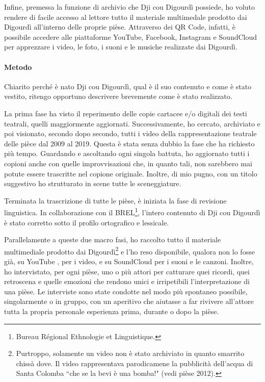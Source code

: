 Infine, premessa la funzione di archivio che Dji cou Digourdì possiede, ho voluto rendere di facile accesso al lettore tutto il materiale multimedale prodotto dai Digourdì all'interno delle proprie pièse. Attraverso dei QR Code, infatti, è possibile accedere alle piattaforme YouTube, Facebook, Instagram e SoundCloud per apprezzare i video, le foto, i suoni e le musiche realizzate dai Digourdì.


\paragraph*{Metodo} Chiarito perché è nato Dji cou Digourdì, qual è il suo contenuto e come è stato vestito, ritengo opportuno descrivere brevemente come è stato realizzato.

La prima fase ha visto il reperimento  delle copie cartacee e/o digitali dei testi teatrali, quelli maggiormente aggiornati. Successivamente, ho cercato, archiviato e poi visionato, secondo dopo secondo, tutti i video della rappresentazione teatrale delle pièce dal 2009 al 2019. Questa è stata senza dubbio la fase che ha richiesto più tempo. Guardando e ascoltando ogni singola battuta, ho aggiornato tutti i copioni anche con quelle improvvisazioni che, in quanto tali, non sarebbero mai potute essere trascritte nel copione originale. Inoltre, di mio pugno, con un titolo suggestivo ho strutturato in scene tutte le sceneggiature.

Terminata la trascrizione di tutte le pièse, è iniziata la fase di revisione linguistica. In collaborazione con il BREL\footnote{ Bureau Régional Ethnologie et Linguistique.}, l'intero contenuto di Dji cou Digourdì è stato corretto sotto il profilo ortografico e lessicale.

Parallelamente a queste due macro fasi, ho raccolto tutto il materiale multimediale prodotto dai Digourdì\footnote{ Purtroppo, solamente un video non è stato archiviato in quanto smarrito chissà dove. Il video rappresentava parodicamene la pubblicità dell'acqua di Santa Colomba ``che se la bevi è una bomba!" (vedi pièse 2012).} e l'ho reso disponibile, qualora non lo fosse già, su YouTube \href{https://www.youtube.com/@the_digourdi}{\yt}, per i video, e su SoundCloud \href{https://soundcloud.com/user-234168361/sets}{\pppp}  per i suoni e le canzoni.
Inoltre, ho intervistato, per ogni pièse, uno o più attori per catturare quei ricordi, quei retroscena e quelle emozioni che rendono unici e irripetibili l'interpretazione di una pièse. Le interviste sono state condotte nel modo più spontaneo possibile, singolarmente o in gruppo, con un aperitivo che aiutasse a far rivivere all'attore tutta la propria personale esperienza prima, durante o dopo la pièse.


